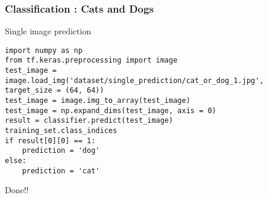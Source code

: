 \begin{frame}[fragile] \frametitle{Classification : Cats and Dogs}
Single image prediction
\begin{lstlisting}
import numpy as np
from tf.keras.preprocessing import image
test_image = image.load_img('dataset/single_prediction/cat_or_dog_1.jpg', target_size = (64, 64))
test_image = image.img_to_array(test_image)
test_image = np.expand_dims(test_image, axis = 0)
result = classifier.predict(test_image)
training_set.class_indices
if result[0][0] == 1:
    prediction = 'dog'
else:
    prediction = 'cat'

\end{lstlisting}
Done!!
\end{frame}


%
%
%
%
%
%
%
